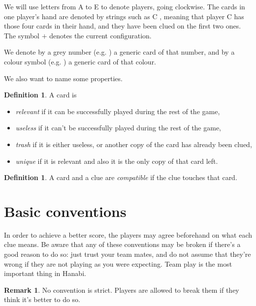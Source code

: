 \documentclass[a4paper]{article}
\theoremstyle{plain}
\theoremstyle{definition}
\newtheorem{definition}[theorem]{Definition}
\newtheorem{remark}[theorem]{Remark}
\begin{document}
We will use letters from A to E to denote players, going clockwise. The cards in one player's hand are denoted by strings such as C    , meaning that player C has those four cards in their hand, and they have been clued on the first two ones. The symbol $+$ denotes the current configuration.

We denote by a grey number (e.g. \hspace{-2.5 mm} ) a generic card of that number, and by a colour symbol (e.g. \hspace{-2.5 mm} ) a generic card of that colour.

We also want to name some properties.

\begin{definition}
	A card is
	
	\begin{itemize}
		\item \textit{relevant} if it can be successfully played during the rest of the game,
		\item \textit{useless} if it can't be successfully played during the rest of the game,
		\item \textit{trash} if it is either useless, or another copy of the card has already been clued,
		\item \textit{unique} if it is relevant and also it is the only copy of that card left.
	\end{itemize}

\end{definition}

\begin{definition}
	A card and a clue are \emph{compatible} if the clue touches that card.
\end{definition}

\section{Basic conventions}

In order to achieve a better score, the players may agree beforehand on what each clue means. Be aware that any of these conventions may be broken if there's a good reason to do so: just trust your team mates, and do not assume that they're wrong if they are not playing as you were expecting. Team play is the most important thing in Hanabi.

\begin{remark}
	No convention is strict. Players are allowed to break them if they think it's better to do so.
\end{remark}
\end{document}
